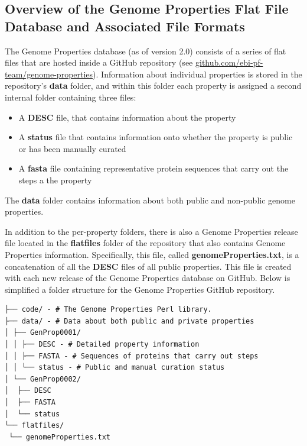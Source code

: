 \subsection{Overview of the Genome Properties Flat File Database and Associated 
File Formats} \label{Genome-Properties-Files} 

The Genome Properties database (as of version 2.0) consists of a series of flat 
files that are hosted inside a GitHub repository (see 
\href{http://github.com/ebi-pf-team/genome-properties}{github.com/ebi-pf-team/genome-properties}). 
Information about individual properties is stored in the repository's 
\textbf{data} folder, and within this folder each property is assigned a second 
internal folder containing three files: 

\begin{itemize}
\item A \textbf{DESC} file, that contains information about the property
\item A \textbf{status} file that contains information onto whether the property 
is public or has been manually curated
\item A \textbf{\gls{fasta}} \cite{pearson19905} file containing representative 
protein sequences that carry out the steps a the property
\end{itemize}

The \textbf{data} folder contains information about both public and non-public 
genome properties. 

In addition to the per-property folders, there is also a Genome Properties 
release file located in the \textbf{flatfiles} folder of the repository that 
also contains Genome Properties information. Specifically, this file, called 
\textbf{genomeProperties.txt}, is a concatenation of all the \textbf{DESC} files 
of all public properties. This file is created with each new release of the 
Genome Properties database on GitHub. Below is simplified a folder structure for 
the Genome Properties GitHub repository.

\begin{verbatim}
├── code/ - # The Genome Properties Perl library.
├── data/ - # Data about both public and private properties
│ ├── GenProp0001/
│ │ ├── DESC - # Detailed property information
│ │ ├── FASTA - # Sequences of proteins that carry out steps
│ │ └── status - # Public and manual curation status
│ └── GenProp0002/
│  ├── DESC
│  ├── FASTA
│  └── status
└── flatfiles/
 └── genomeProperties.txt
\end{verbatim}


